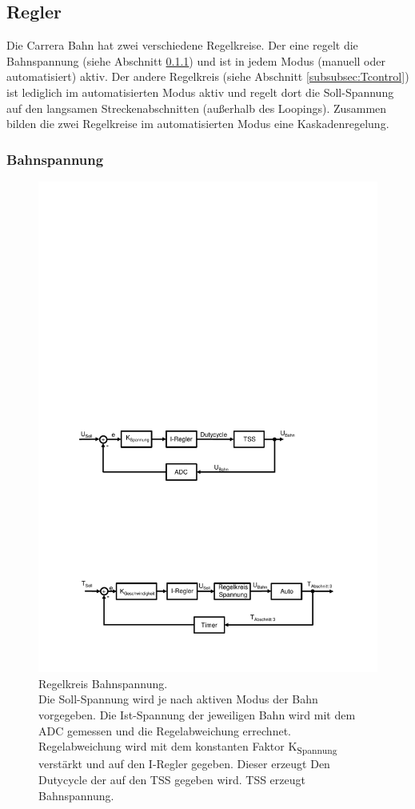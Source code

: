 \documentclass[a4paper, 11pt]{report}
\begin{document}
	\subsection{Regler}\label{subsec:control}
Die Carrera Bahn hat zwei verschiedene Regelkreise. 
Der eine regelt die Bahnspannung (siehe Abschnitt \ref{subsubsec:Ucontrol}) und ist in jedem Modus (manuell oder automatisiert) aktiv. 
Der andere Regelkreis (siehe Abschnitt \ref{subsubsec:Tcontrol}) ist lediglich im automatisierten Modus aktiv und regelt dort die Soll-Spannung auf den langsamen Streckenabschnitten (außerhalb des Loopings).
Zusammen bilden die zwei Regelkreise im automatisierten Modus eine Kaskadenregelung.
		\subsubsection{Bahnspannung}\label{subsubsec:Ucontrol}
			\begin{figure}[ht]
				\centering
				\includegraphics[width=\textwidth]{rec/Ucontrol.pdf}
				\caption[Regelkreis Bahnspannung]{Regelkreis Bahnspannung.\\Die Soll-Spannung wird je nach aktiven Modus der Bahn vorgegeben.
				Die Ist-Spannung der jeweiligen Bahn wird mit dem ADC gemessen und die Regelabweichung errechnet.
				Regelabweichung wird mit dem konstanten Faktor K\textsubscript{Spannung} verstärkt und auf den I-Regler gegeben.
				Dieser erzeugt Den Dutycycle der auf den TSS gegeben wird.
				TSS erzeugt Bahnspannung.}
				\label{fig:Ucontrol}
			\end{figure}
\end{document}
